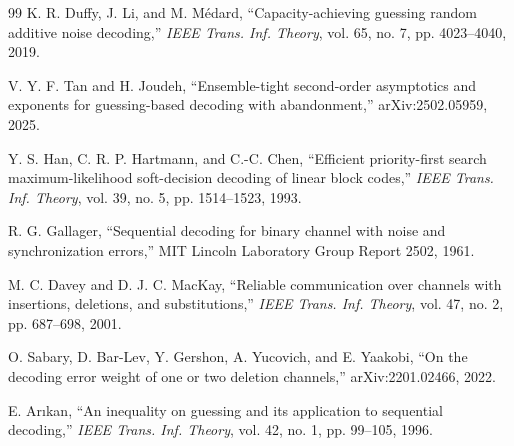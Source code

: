 \documentclass[11pt]{article}
\theoremstyle{definition}
\theoremstyle{remark}
\begin{document}
\begin{thebibliography}{99}
K. R. Duffy, J. Li, and M. M\'edard, ``Capacity-achieving guessing random additive noise decoding,'' \emph{IEEE Trans. Inf. Theory}, vol. 65, no. 7, pp. 4023--4040, 2019.

V. Y. F. Tan and H. Joudeh, ``Ensemble-tight second-order asymptotics and exponents for guessing-based decoding with abandonment,'' arXiv:2502.05959, 2025.

Y. S. Han, C. R. P. Hartmann, and C.-C. Chen, ``Efficient priority-first search maximum-likelihood soft-decision decoding of linear block codes,'' \emph{IEEE Trans. Inf. Theory}, vol. 39, no. 5, pp. 1514--1523, 1993.

R. G. Gallager, ``Sequential decoding for binary channel with noise and synchronization errors,'' MIT Lincoln Laboratory Group Report 2502, 1961.

M. C. Davey and D. J. C. MacKay, ``Reliable communication over channels with insertions, deletions, and substitutions,'' \emph{IEEE Trans. Inf. Theory}, vol. 47, no. 2, pp. 687--698, 2001.

O. Sabary, D. Bar-Lev, Y. Gershon, A. Yucovich, and E. Yaakobi, ``On the decoding error weight of one or two deletion channels,'' arXiv:2201.02466, 2022.

E. Ar\i kan, ``An inequality on guessing and its application to sequential decoding,'' \emph{IEEE Trans. Inf. Theory}, vol. 42, no. 1, pp. 99--105, 1996.
\end{thebibliography}
\end{document}
